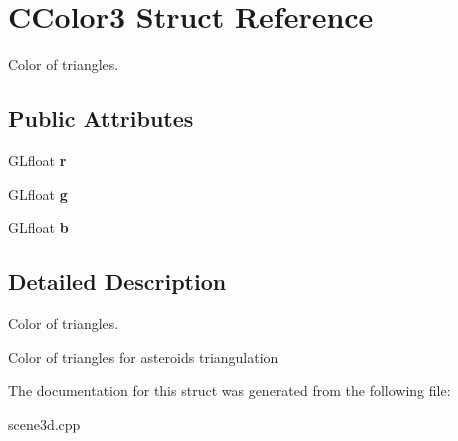 \hypertarget{struct_c_color3}{}\section{C\+Color3 Struct Reference}
\label{struct_c_color3}


Color of triangles.  


\subsection*{Public Attributes}
\begin{DoxyCompactItemize}
\item 
\mbox{\label{struct_c_color3_a59923e93dea0276de8923511da84f8cf}} 
G\+Lfloat {\bfseries r}
\item 
\mbox{\label{struct_c_color3_a8a27bc742ac4de67f66119a1944a7783}} 
G\+Lfloat {\bfseries g}
\item 
\mbox{\label{struct_c_color3_a83bd8092553eab8df4f1b542b86ffd97}} 
G\+Lfloat {\bfseries b}
\end{DoxyCompactItemize}


\subsection{Detailed Description}
Color of triangles. 

Color of triangles for asteroid\textquotesingle{}s triangulation 

The documentation for this struct was generated from the following file\+:\begin{DoxyCompactItemize}
\item 
scene3d.\+cpp\end{DoxyCompactItemize}
